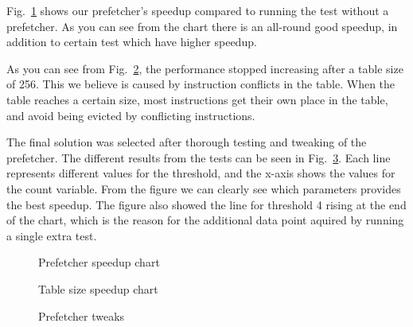 Fig.~\ref{fig:prefetcher_speedup} shows our prefetcher's speedup compared to
running the test without a prefetcher. As you can see from the chart there is
an all-round good speedup, in addition to certain test which have higher
speedup.

As you can see from Fig.~\ref{fig:table_size_chart}, the performance stopped
increasing after a table size of 256. This we believe is caused by instruction
conflicts in the table. When the table reaches a certain size, most
instructions get their own place in the table, and avoid being evicted by
conflicting instructions.

The final solution was selected after thorough testing and tweaking of the
prefetcher. The different results from the tests can be seen in
Fig.~\ref{fig:prefetcher_tweaks}. Each line represents different values for the
threshold, and the x-axis shows the values for the count variable. From the figure we can clearly see which parameters provides the best speedup. The figure also showed the line for threshold 4 rising at the end of the chart, which is the reason for the additional data point aquired by running a single extra test.

\begin{figure}
	
	\caption{Prefetcher speedup chart}
	\label{fig:prefetcher_speedup}
\end{figure}

\begin{figure}
	
	\caption{Table size speedup chart}
	\label{fig:table_size_chart}
\end{figure}

\begin{figure}
	
	\caption{Prefetcher tweaks}
	\label{fig:prefetcher_tweaks}
\end{figure}
